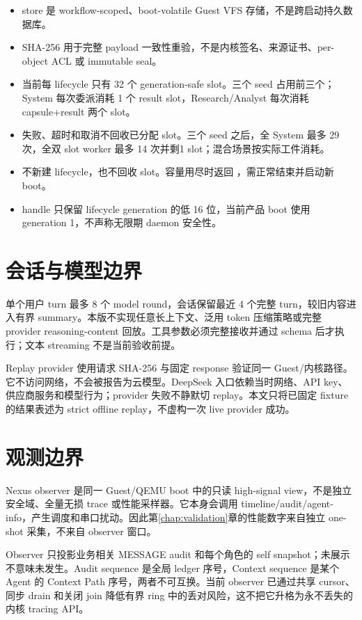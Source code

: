 \begin{itemize}
  \item store 是 workflow-scoped、boot-volatile Guest VFS 存储，不是跨启动持久数据库。
  \item SHA-256 用于完整 payload 一致性重验，不是内核签名、来源证书、per-object ACL 或 immutable seal。
  \item 当前每 lifecycle 只有 32 个 generation-safe slot。三个 seed 占用前三个；System 每次委派消耗 1 个 result slot，Research/Analyst 每次消耗 capsule+result 两个 slot。
  \item 失败、超时和取消不回收已分配 slot。三个 seed 之后，全 System 最多 29 次，全双 slot worker 最多 14 次并剩1 slot；混合场景按实际工件消耗。
  \item {} 不新建 lifecycle，也不回收 slot。容量用尽时返回 ，需正常结束并启动新 boot。
  \item handle 只保留 lifecycle generation 的低 16 位，当前产品 boot 使用 generation 1，不声称无限期 daemon 安全性。
\end{itemize}

\section{会话与模型边界}

单个用户 turn 最多 8 个 model round，会话保留最近 4 个完整 turn，较旧内容进入有界 summary。本版不实现任意长上下文、泛用 token 压缩策略或完整 provider reasoning-content 回放。工具参数必须完整接收并通过 schema 后才执行；文本 streaming 不是当前验收前提。

Replay provider 使用请求 SHA-256 与固定 response 验证同一 Guest/内核路径。它不访问网络，不会被报告为云模型。DeepSeek 入口依赖当时网络、API key、供应商服务和模型行为；provider 失败不静默切 replay。本文只将已固定 fixture 的结果表述为 strict offline replay，不虚构一次 live provider 成功。

\section{观测边界}

Nexus observer 是同一 Guest/QEMU boot 中的只读 high-signal view，不是独立安全域、全量无损 trace 或性能采样器。它本身会调用 timeline/audit/agent-info，产生调度和串口扰动。因此第\ref{chap:validation}章的性能数字来自独立 one-shot 采集，不来自 observer 窗口。

Observer 只投影业务相关 MESSAGE audit 和每个角色的 self snapshot；未展示不意味未发生。Audit sequence 是全局 ledger 序号，Context sequence 是某个 Agent 的 Context Path 序号，两者不可互换。当前 observer 已通过共享 cursor、同步 drain 和关闭 join 降低有界 ring 中的丢对风险，这不把它升格为永不丢失的内核 tracing API。

